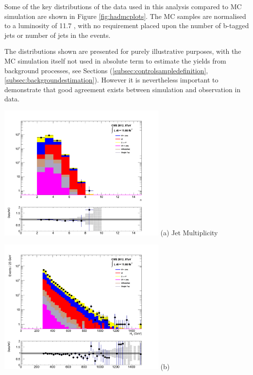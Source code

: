 Some of the key distributions of the data used in this analysis compared to MC simulation are shown in Figure \ref{fig:hadmcplots}. The MC samples are normalised to a luminosity of 11.7 \fb,  with no requirement placed upon the number of b-tagged jets or number of jets in the events. 

The distributions shown are presented for purely illustrative purposes, with the MC simulation itself not used in absolute term to estimate the yields from background processes, see Sections (\ref{subsec:controlsampledefinition},\ref{subsec:backgroundestimation}). However it is nevertheless important to demonstrate that good agreement exists between simulation and observation in data.

\begin{minipage}{\linewidth}
\centering
\begin{minipage}{.48\textwidth}
\centering
\includegraphics[width = 3.3in]{plots/had_njet_datamc.pdf}
(a) Jet Multiplicity
\end{minipage}
\begin{minipage}{.48\textwidth}
\centering
\includegraphics[width = 3.3in]{plots/had_ht_datamc.pdf}
(b) \theht
\end{minipage}
\begin{minipage}{.48\textwidth}

\end{minipage}
\end{minipage}
